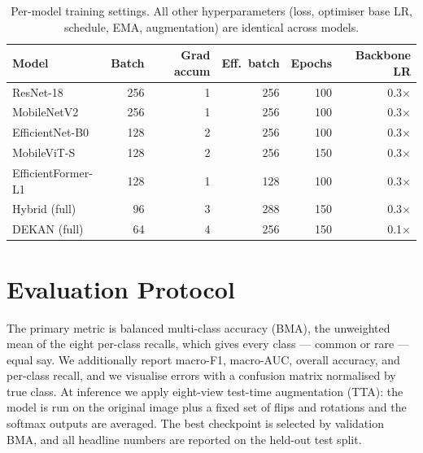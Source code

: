\begin{table}[H]
\centering
\caption{Per-model training settings. All other hyperparameters (loss, optimiser
base LR, schedule, EMA, augmentation) are identical across models.}
\label{tab:traincfg}
\begin{tabular}{lrrrrr}
\toprule
Model & Batch & Grad accum & Eff.\ batch & Epochs & Backbone LR \\
\midrule
ResNet-18           & 256 & 1 & 256 & 100 & 0.3$\times$ \\
MobileNetV2         & 256 & 1 & 256 & 100 & 0.3$\times$ \\
EfficientNet-B0     & 128 & 2 & 256 & 100 & 0.3$\times$ \\
MobileViT-S         & 128 & 2 & 256 & 150 & 0.3$\times$ \\
EfficientFormer-L1  & 128 & 1 & 128 & 100 & 0.3$\times$ \\
Hybrid (full)       & 96  & 3 & 288 & 150 & 0.3$\times$ \\
DEKAN (full)        & 64  & 4 & 256 & 150 & 0.1$\times$ \\
\bottomrule
\end{tabular}
\end{table}

\section{Evaluation Protocol}

The primary metric is balanced multi-class accuracy (BMA), the unweighted mean of
the eight per-class recalls, which gives every class --- common or rare --- equal
say. We additionally report macro-F1, macro-AUC, overall accuracy, and per-class
recall, and we visualise errors with a confusion matrix normalised by true class.
At inference we apply eight-view test-time augmentation (TTA): the model is run
on the original image plus a fixed set of flips and rotations and the softmax
outputs are averaged. The best checkpoint is selected by validation BMA, and all
headline numbers are reported on the held-out test split.
